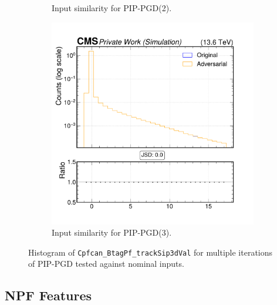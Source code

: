 \begin{figure}[htbp]
\begin{subfigure}[t]{0.32\textwidth}
    \caption*{Input similarity for PIP-PGD(2).}
  \end{subfigure}\hfill
  \begin{subfigure}[t]{0.32\textwidth}
    \includegraphics[width=\linewidth]{media/output/features/compare/combined_it_3/cmp_cpf_arr_Cpfcan_BtagPf_trackSip3dVal.pdf}
    \caption*{Input similarity for PIP-PGD(3).}
  \end{subfigure}

  \caption*{Histogram of \texttt{Cpfcan\_BtagPf\_trackSip3dVal} for multiple iterations of PIP-PGD tested against nominal inputs.}
  \label{fig:combined_input_Cpfcan_BtagPf_trackSip3dVal}
\end{figure}

\newpage
\subsection*{NPF Features}


